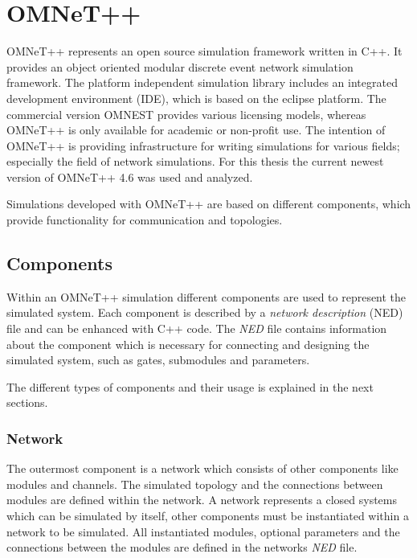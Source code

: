 \chapter{OMNeT++}
\label{cha:omnet}

OMNeT++ represents an open source simulation framework written in C++.
It provides an object oriented modular discrete event network simulation framework.
The platform independent simulation library includes an integrated development environment (IDE), which is based on the eclipse platform.
The commercial version OMNEST provides various licensing models, whereas OMNeT++ is only available for academic or non-profit use.
The intention of OMNeT++ is providing infrastructure for writing simulations for various fields; especially the field of network simulations.
For this thesis the current newest version of OMNeT++ 4.6 was used and analyzed.

Simulations developed with OMNeT++ are based on different components, which provide functionality for communication and topologies.

\section{Components}
\label{sec:omnet_components}
Within an OMNeT++ simulation different components are used to represent the simulated system.
Each component is described by a \emph{network description} (NED) file and can be enhanced with C++ code.
The \emph{NED} file contains information about the component which is necessary for connecting and designing the simulated system, such as gates, submodules and parameters.

The different types of components and their usage is explained in the next sections.

\subsection{Network}
\label{sec:omnet_components_network}
The outermost component is a network which consists of other components like modules and channels.
The simulated topology and the connections between modules are defined within the network.
A network represents a closed systems which can be simulated by itself, other components must be instantiated within a network to be simulated.
All instantiated modules, optional parameters and the connections between the modules are defined in the networks \emph{NED} file. \cite[section 3.2.1]{omnet_manual}

